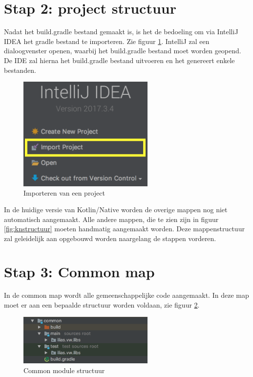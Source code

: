 \section{Stap 2: project structuur}
Nadat het build.gradle bestand gemaakt is, is het de bedoeling om via IntelliJ IDEA het gradle bestand te importeren. Zie figuur \ref{fig:stap2-import}. IntelliJ zal een dialoogvenster openen, waarbij het build.gradle bestand moet worden geopend. De IDE zal hierna het build.gradle bestand uitvoeren en het genereert enkele bestanden.

\begin{figure} [ht]
	\centering
	\includegraphics[width=0.60\textwidth]{img/stap2-import.png}
	\caption{Importeren van een project}
	\label{fig:stap2-import}
\end{figure}

In de huidige versie van Kotlin/Native worden de overige mappen nog niet automatisch aangemaakt. Alle andere mappen, die te zien zijn in figuur \ref{fig:knstructuur} moeten handmatig aangemaakt worden. Deze mappenstructuur zal geleidelijk aan opgebouwd worden naargelang de stappen vorderen.

\section{Stap 3: Common map }
In de common map wordt alle gemeenschappelijke code aangemaakt. In deze map moet er aan een bepaalde structuur worden voldaan, zie figuur \ref{fig:stap3-common}.

\begin{figure} [ht]
	\centering
	\includegraphics[width=0.60\textwidth]{img/stap3-common.png}
	\caption{Common module structuur}
	\label{fig:stap3-common}
\end{figure}

